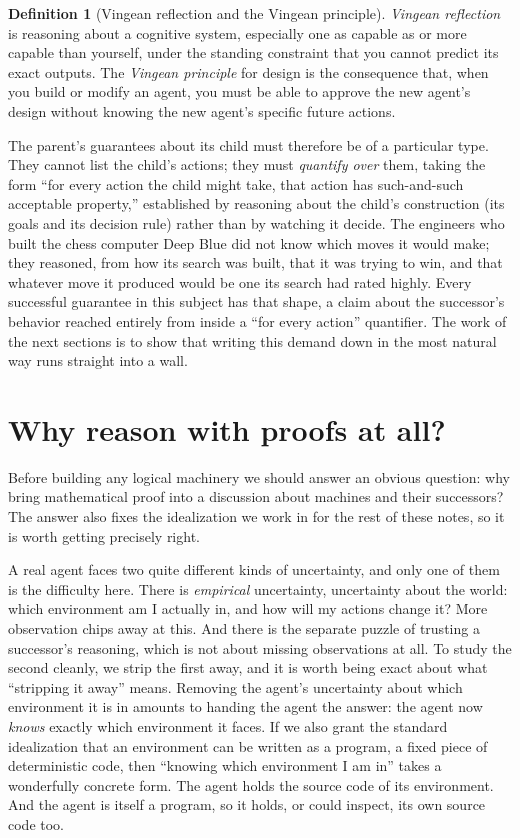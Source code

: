 \documentclass[10pt]{article}
\theoremstyle{definition}
\newtheorem{definition}[theorem]{Definition}
\theoremstyle{remark}
\begin{document}
\begin{definition}[Vingean reflection and the Vingean principle]
\label{def:vingean}
\emph{Vingean reflection} is reasoning about a cognitive system, especially one as capable as or more capable than yourself, under the standing constraint that you cannot predict its exact outputs. The \emph{Vingean principle} for design is the consequence that, when you build or modify an agent, you must be able to approve the new agent's design without knowing the new agent's specific future actions.
\end{definition}

The parent's guarantees about its child must therefore be of a particular type. They cannot list the child's actions; they must \emph{quantify over} them, taking the form ``for every action the child might take, that action has such-and-such acceptable property,'' established by reasoning about the child's construction (its goals and its decision rule) rather than by watching it decide. The engineers who built the chess computer Deep Blue did not know which moves it would make; they reasoned, from how its search was built, that it was trying to win, and that whatever move it produced would be one its search had rated highly. Every successful guarantee in this subject has that shape, a claim about the successor's behavior reached entirely from inside a ``for every action'' quantifier. The work of the next sections is to show that writing this demand down in the most natural way runs straight into a wall.

\section{Why reason with proofs at all?}
\label{sec:whyproofs}

Before building any logical machinery we should answer an obvious question: why bring mathematical proof into a discussion about machines and their successors? The answer also fixes the idealization we work in for the rest of these notes, so it is worth getting precisely right.

A real agent faces two quite different kinds of uncertainty, and only one of them is the difficulty here. There is \emph{empirical} uncertainty, uncertainty about the world: which environment am I actually in, and how will my actions change it? More observation chips away at this. And there is the separate puzzle of trusting a successor's reasoning, which is not about missing observations at all. To study the second cleanly, we strip the first away, and it is worth being exact about what ``stripping it away'' means. Removing the agent's uncertainty about which environment it is in amounts to handing the agent the answer: the agent now \emph{knows} exactly which environment it faces. If we also grant the standard idealization that an environment can be written as a program, a fixed piece of deterministic code, then ``knowing which environment I am in'' takes a wonderfully concrete form. The agent holds the source code of its environment. And the agent is itself a program, so it holds, or could inspect, its own source code too.
\end{document}
